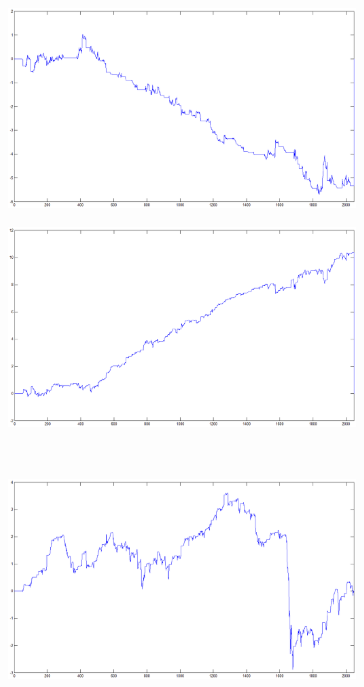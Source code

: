 \documentclass{tewiart}
\begin{document}
\FloatBarrier
\begin{figure}[h]
\centering
\begin{minipage}{.49\linewidth}
\centering
\includegraphics[width=0.82\textwidth]{images/silverA.eps}
\label{jedno}
\end{minipage}
\begin{minipage}{.49\linewidth}
\centering
\includegraphics[width=0.82\textwidth]{images/silverB.eps}
\label{dwu}
\end{minipage}
\\
\begin{minipage}{.49\linewidth}
\centering
\includegraphics[width=0.82\textwidth]{images/silverC.eps}

\end{minipage}
\end{figure}
\end{document}
